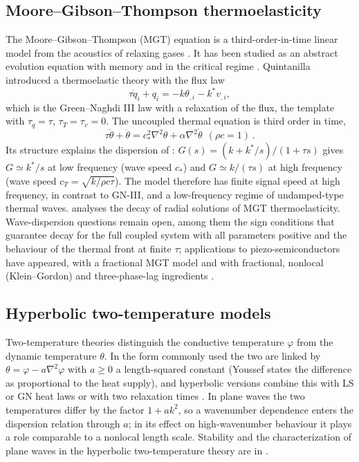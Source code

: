 \subsection{Moore--Gibson--Thompson thermoelasticity}\label{sec:mgt}
The Moore--Gibson--Thompson (MGT) equation is a third-order-in-time linear model from the acoustics of relaxing gases \citep{MooreGibson1960}. It has been studied as an abstract evolution equation with memory and in the critical regime \citep{MarchandMcDevittTriggiani2012,LasieckaWang2015MGT,DellOroLasieckaPata2016MGT,DellOroPata2016Viscoelasticity}. Quintanilla \citep{Quintanilla2019} introduced a thermoelastic theory with the flux law
\begin{equation}
\tau\dot q_i+q_i=-k\theta_{,i}-k^*v_{,i},
\end{equation}
which is the Green--Naghdi III law with a relaxation of the flux, the template with $\tau_q=\tau$, $\tau_T=\tau_v=0$. The uncoupled thermal equation is third order in time,
\begin{equation}
\tau\dddot\theta+\ddot\theta=c_*^2\nabla^2\theta+\alpha\nabla^2\dot\theta\ \ (\rho c=1)\,.
\end{equation}
Its structure explains the dispersion of : $G(s)=(k+k^*/s)/(1+\tau s)$ gives $G\simeq k^*/s$ at low frequency (wave speed $c_*$) and $G\simeq k/(\tau s)$ at high frequency (wave speed $c_T=\sqrt{k/\rho c\tau}$). The model therefore has finite signal speed at high frequency, in contrast to GN-III, and a low-frequency regime of undamped-type thermal waves. \citep{Bazarra2021MGTradial} analyses the decay of radial solutions of MGT thermoelasticity. Wave-dispersion questions remain open, among them the sign conditions that guarantee decay for the full coupled system with all parameters positive and the behaviour of the thermal front at finite $\tau$; applications to piezo-semiconductors have appeared, with a fractional MGT model \citep{Gupta2024} and with fractional, nonlocal (Klein--Gordon) and three-phase-lag ingredients \citep{Aldandani2026}.

\subsection{Hyperbolic two-temperature models}
Two-temperature theories \citep{ChenGurtin1968,Youssef2006} distinguish the conductive temperature $\varphi$ from the dynamic temperature $\theta$. In the form commonly used the two are linked by $\theta=\varphi-a\nabla^2\varphi$ with $a\ge0$ a length-squared constant (Youssef states the difference as proportional to the heat supply), and hyperbolic versions combine this with LS or GN heat laws \citep{Prasad2020,Alzahrani2020} or with two relaxation times \citep{Bassiouny2020}. In plane waves the two temperatures differ by the factor $1+ak^2$, so a wavenumber dependence enters the dispersion relation through $a$; in its effect on high-wavenumber behaviour it plays a role comparable to a nonlocal length scale. Stability and the characterization of plane waves in the hyperbolic two-temperature theory are in \citep{Prasad2020}.

